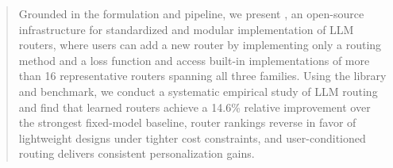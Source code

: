 \begin{abstract}
Grounded in the formulation and pipeline, we present \textbf{\method}, an open-source infrastructure for standardized and modular implementation of LLM routers, where users can add a new router by implementing only a routing method and a loss function and access built-in implementations of more than 16 representative routers spanning all three families.
Using the library and benchmark, we conduct a systematic empirical study of LLM routing and find that learned routers achieve a 14.6\% relative improvement over the strongest fixed-model baseline, router rankings reverse in favor of lightweight designs under tighter cost constraints, and user-conditioned routing delivers consistent personalization gains.
\end{abstract}
